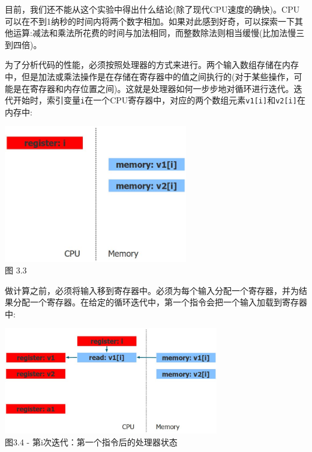目前，我们还不能从这个实验中得出什么结论(除了现代CPU速度的确快)。CPU可以在不到1纳秒的时间内将两个数字相加。如果对此感到好奇，可以探索一下其他运算:减法和乘法所花费的时间与加法相同，而整数除法则相当缓慢(比加法慢三到四倍)。

为了分析代码的性能，必须按照处理器的方式来进行。两个输入数组存储在内存中，但是加法或乘法操作是在存储在寄存器中的值之间执行的(对于某些操作，可能是在寄存器和内存位置之间)。这就是处理器如何一步步地对循环进行迭代。迭代开始时，索引变量\texttt{i}在一个CPU寄存器中，对应的两个数组元素\texttt{v1[i]}和\texttt{v2[i]}在内存中:

\begin{center}
\includegraphics[width=0.6\textwidth]{content/1/chapter3/images/3.jpg}\\
图 3.3
\end{center}

做计算之前，必须将输入移到寄存器中。必须为每个输入分配一个寄存器，并为结果分配一个寄存器。在给定的循环迭代中，第一个指令会把一个输入加载到寄存器中:

\begin{center}
\includegraphics[width=0.7\textwidth]{content/1/chapter3/images/4.jpg}\\
图3.4 - 第i次迭代：第一个指令后的处理器状态
\end{center}

